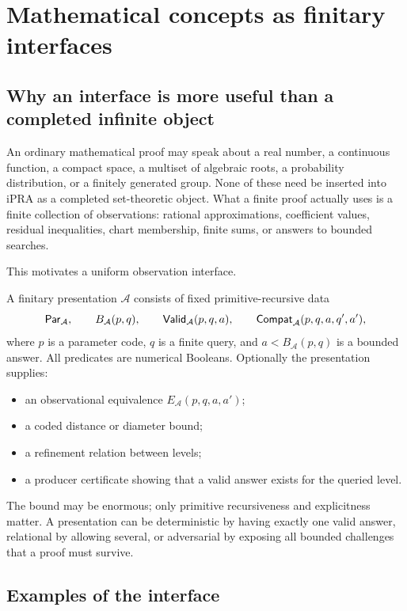 \section{Mathematical concepts as finitary interfaces}\label{sec:interfaces}

\subsection{Why an interface is more useful than a completed infinite object}

An ordinary mathematical proof may speak about a real number, a continuous function, a compact space, a multiset of algebraic roots, a probability distribution, or a finitely generated group.  None of these need be inserted into iPRA as a completed set-theoretic object.  What a finite proof actually uses is a finite collection of observations: rational approximations, coefficient values, residual inequalities, chart membership, finite sums, or answers to bounded searches.

This motivates a uniform observation interface.

\begin{definition}
A finitary presentation \(\mathcal A\) consists of fixed primitive-recursive data
\[
  \mathsf{Par}_{\mathcal A},\qquad
  B_{\mathcal A}(p,q),\qquad
  \mathsf{Valid}_{\mathcal A}(p,q,a),\qquad
  \mathsf{Compat}_{\mathcal A}(p,q,a,q',a'),
\]
where \(p\) is a parameter code, \(q\) is a finite query, and \(a<B_{\mathcal A}(p,q)\) is a bounded answer.  All predicates are numerical Booleans.  Optionally the presentation supplies:
\begin{itemize}
\item an observational equivalence \(E_{\mathcal A}(p,q,a,a')\);
\item a coded distance or diameter bound;
\item a refinement relation between levels;
\item a producer certificate showing that a valid answer exists for the queried level.
\end{itemize}
\end{definition}

The bound may be enormous; only primitive recursiveness and explicitness matter.  A presentation can be deterministic by having exactly one valid answer, relational by allowing several, or adversarial by exposing all bounded challenges that a proof must survive.

\subsection{Examples of the interface}


